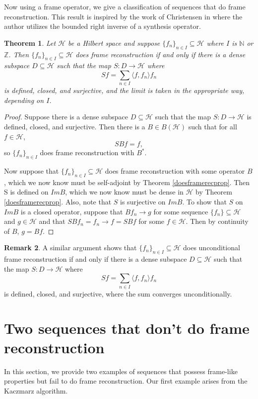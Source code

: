 \documentclass[11pt]{amsart}
\newtheorem{thm}{Theorem}[section]
\theoremstyle{definition}
\newtheorem{rem}[thm]{Remark}
\numberwithin{equation}{section}
\newcommand{\Hcal}{\mathcal{H}} %
\begin{document}
Now using a frame operator, we give a classification of sequences that do frame reconstruction. This result is inspired by the work of Christensen in \cite{Christensen1995Frames} where the author utilizes the bounded right inverse of a synthesis operator.
\begin{thm}
Let $\Hcal$ be a Hilbert space and suppose $\{f_{n}\}_{n\in I}\subseteq \Hcal$ where $I$ is $\mathbb{N}$ or $\mathbb{Z}$. Then $\{f_{n}\}_{n\in I}\subseteq \Hcal$ does frame reconstruction if and only if there is a dense subspace $D\subseteq \Hcal$ such that the map $S:D\to \Hcal$ where
$$Sf= \sum_{n\in I}\langle f, f_{n}\rangle f_{n}$$ is defined, closed, and surjective, and the limit is taken in the appropriate way, depending on $I$.\end{thm}
\begin{proof}
Suppose there is a dense subspace $D\subseteq \Hcal$ such that the map $S:D\to \Hcal$ is defined, closed, and surjective. Then there is a $B\in B(\Hcal)$ such that for all $f\in \Hcal$,
$$SBf=f,$$ so $\{f_{n}\}_{n\in I}$ does frame reconstruction with $B^{*}$.

Now suppose that $\{f_{n}\}_{n\in I}\subseteq \Hcal$ does frame reconstruction with some operator $B$, which we now know must be self-adjoint by Theorem \ref{doesframerecprop}. Then S is defined on $ImB$, which we now know must be dense in $\Hcal$ by Theorem \ref{doesframerecprop}. Also, note that $S$ is surjective on $ImB$. To show that $S$ on $ImB$ is a closed operator, suppose that $Bf_n\to g$ for some sequence $\{f_{n}\}\subseteq \Hcal$ and $g\in \Hcal$ and that $SBf_n=f_n\to f=SBf$ for some $f\in \Hcal$. Then by continuity of $B$, $g=Bf.$
\end{proof}

\begin{rem}
A similar argument shows that $\{f_{n}\}_{n\in I}\subseteq \Hcal$ does unconditional frame reconstruction if and only if there is a dense subspace $D\subseteq \Hcal$ such that the map $S:D\to \Hcal$ where
$$Sf= \sum_{n\in I}\langle f, f_{n}\rangle f_{n}$$ is defined, closed, and surjective, where the sum converges unconditionally.
\end{rem}

\section{Two sequences that don't do frame reconstruction}\label{s4}
In this section, we provide two examples of sequences that possess frame-like properties but fail to do frame reconstruction. Our first example arises from the Kaczmarz algorithm. 
\end{document}
